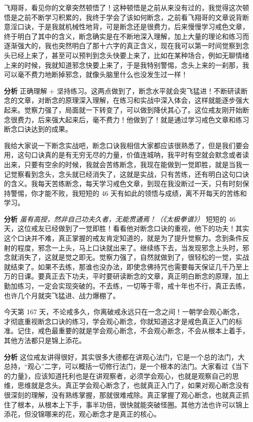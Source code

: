 \begin{case}
    飞翔哥，看见你的文章突然顿悟了！这种顿悟是之前从来没有过的，我觉得这次顿悟是之前不断学习积累的，我终于学会了该如何断念，之前看飞翔哥的文章说背断意淫口诀，于是我就机械性地背，可是断念还是很费力，后来慢慢学习戒色文章，终于明白了其中的含义，断念确实是在不断地深入理解，加上大量的理论和练习而逐渐强大的，我也突然明白了那十六字的真正含义，现在我可以第一时间觉察到念头已经上来了，甚至可以预判到念头快要上来了，比如在某种场合，例如无聊情绪上来的时候，我就知道邪念快要上来了，于是我特别警惕，念头上来的一刹那，我可以毫不费力地断掉邪念，就像头脑里什么也没发生过一样！

    \textbf{分析} 正确理解 + 坚持练习。这两点做到了，断念水平就会突飞猛进！不断研读断念的文章，对断念的原理深入理解，在练习和实战中深入体会，这样就能逐步强大起来。觉察力强了，局面就一下转变了，可以做到降伏其心了。这位戒友刚开始断念很费力，后来强大起来后，毫不费力！他做到了！就是通过学习戒色文章和练习断念口诀达到的成果。
\end{case}

\begin{case}
    我给大家说一下断念实战吧，断念口诀我相信大家都应该很熟悉了，但是我们要会用，这句口诀真的是有无穷无尽的力量，价值连城呐，我平时有空就会默念或者读出来，只要有空余的时候，我就会苦练断念，我现在能做到一觉即胜，就是当我一记觉察看到念头，念头就已经消失了，这就是实战，只有苦练，还有明白这句口诀的含义。我每天苦练断念，每天学习戒色文章，到现在我没断过一天，只有时刻保持警惕，你才能不败，我短短的 46 天有如此的领悟与成绩，离不开每天的苦练和学习。

    \textbf{分析} \textit{虽有高授，然非自己功夫久者，无能贯通焉！（《太极拳谱》）} 短短的 46 天，这位戒友已经做到了一觉即胜！看看他对断念口诀的重视，他下的功夫！其实这个口诀并不难，真正掌握的戒友肯定知道的，就是为了提升觉察力。念到条件反射的程度，邪念一上头，马上口诀就出来了。继续练下去，当发现邪念上头时，邪念就消失了，这就是觉之即无。觉察力强了，自然就做到了，很轻松的一觉，实战就结束了。如果不去练，那谁也没办法，即使念佛持咒也需要每天保证几千乃至上万的日课。要真正去下功夫，平时要研读断念的文章，真正明白断念的原理，加上勤加练习，一定会实现突破的。不去练，一切等于零，戒十年也不行，真正去练，也许几个月就突飞猛进、战力爆棚了。
\end{case}

\begin{case}
    今天第 167 天，不论戒多久，你离破戒永远只在一念之间！一朝学会观心断念，才彻底重视断念口诀的练习，学会观心断念，你就知道这才是戒色真正入门的标准。记住，戒色最重要的就是学会观心断念，不会观心断念，不会从根本上着手，其他方法都只是锦上添花。

    \textbf{分析} 这位戒友讲得很好，其实很多大德都在讲观心法门，它是一个总的法门，大总持，“观心”二字，可以概括一切修行法门，是一个根本的法门。大家看过《当下的力量》，应该知道托利也是在讲观察者，必须学会观心，也就是观察自己的思维，思维就是念头。真正学会观心断念了，也就真正入门了，如果对观心断念没有很深刻的理解，没有熟练掌握，那就很难戒除。真正掌握了观心断念，也就真正抓住了根本，从根本上下手，事半功倍，很快就能突破怪圈。其他方法也许可以锦上添花，但没锦哪来的花，观心断念才是真正的核心。
\end{case}

